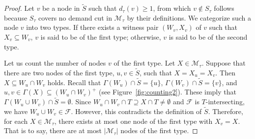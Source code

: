 \documentclass[11pt]{article}
\newcommand{\Ffam}{\mathcal{F}}
\newcommand{\Mfam}{\mathcal{M}}
\begin{document}
  \begin{proof}
   Let $v$ be a node in $\tilde{S}$ such that 
   $d_{\tau}(v) \geq 1$, from which
   $v \not\in S_{\tau}$ follows
   because $S_{\tau}$ covers no demand cut in $\Mfam_{\tau}$ by
   their definitions.
   We categorize such a node $v$ into two types.
   If there exists a witness pair
   $(W_v,X_v)$ of $v$
   such that $X_v \subseteq W_v$, $v$ is said to be of the first type;
   otherwise, $v$ is said to be of the second type.

   Let us count the number of nodes $v$ of the first type.
   Let $X \in \Mfam_{\tau}$. Suppose that there are two nodes of the first type, $u,v \in
   \tilde{S}$,
   such that $X =X_u= X_v$.
   Then $X \subseteq W_u \cap W_v$ holds.
   Recall that $\Gamma(W_u)\cap \tilde{S}=\{u\}$, 
   $\Gamma(W_v)\cap \tilde{S}=\{v\}$,
   and $u,v \in \Gamma(X) \subseteq (W_u \cap W_v)^+$
   (see Figure~\ref{fig:counting2}).
   These imply that $\Gamma(W_u \cup W_v)\cap \tilde{S}=\emptyset$.
   Since $W_{u}\cap W_v \cap T \supseteq X \cap T \neq \emptyset$
   and $\Ffam$ is $T$-intersecting, we have
   $W_u \cup W_v \in \Ffam$. However, this contradicts the
   definition of $\tilde{S}$.
   Therefore, for each $X \in \Mfam_{\tau}$,
   there exists at most one node of the first type with $X_v=X$. That is to say,
  there are at most $|\Mfam_{\tau}|$ nodes of the first type.


\end{proof}
\end{document}
